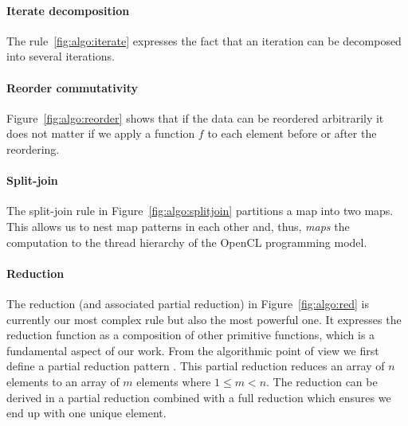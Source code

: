  
\paragraph{Iterate decomposition}
The rule~\ref{fig:algo:iterate} expresses the fact that an iteration can be decomposed into several iterations.

\paragraph{Reorder commutativity}
Figure~\ref{fig:algo:reorder} shows that if the data can be reordered arbitrarily it does not matter if we apply a function $f$ to each element before or after the reordering.

\paragraph{Split-join}
The split-join rule in Figure~\ref{fig:algo:splitjoin} partitions a map into two maps.
This allows us to nest map patterns in each other and, thus, \emph{maps} the computation to the thread hierarchy of the OpenCL programming model.


\paragraph{Reduction}
The reduction (and associated partial reduction) in Figure~\ref{fig:algo:red} is currently our most complex rule but also the most powerful one.
It expresses the reduction function as a composition of other primitive functions, which is a fundamental aspect of our work.
From the algorithmic point of view we first define a partial reduction pattern .
This partial reduction reduces an array of $n$ elements to an array of $m$ elements where $1 \leq m < n$.
The reduction can be derived in a partial reduction combined with a full reduction which ensures we end up with one unique element.

